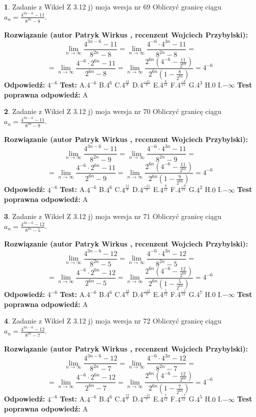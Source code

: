\documentclass[12pt, a4paper]{article}
\theoremstyle{definition} %
\newtheorem{zad}{}
\newcommand{\zadStart}[1]{\begin{zad}#1\newline}
\newcommand{\zadStop}{\end{zad}}
\newcommand{\rozwStart}[2]{\noindent \textbf{Rozwiązanie (autor #1 , recenzent #2): }\newline}
\newcommand{\rozwStop}{\newline}
\newcommand{\odpStart}{\noindent \textbf{Odpowiedź:}\newline}
\newcommand{\odpStop}{\newline}
\newcommand{\testStart}{\noindent \textbf{Test:}\newline}
\newcommand{\testStop}{\newline}
\newcommand{\kluczStart}{\noindent \textbf{Test poprawna odpowiedź:}\newline}
\newcommand{\kluczStop}{\newline}
\begin{document}
\zadStart{Zadanie z Wikieł Z 3.12 j) moja wersja nr 69}
Obliczyć granicę ciągu $a_{n}=\frac{4^{3n-6}-11}{8^{2n}-8}$.
\zadStop
\rozwStart{Patryk Wirkus}{Wojciech Przybylski}
$$\lim\limits_{n\to\infty}\frac{4^{3n-6}-11}{8^{2n}-8}= \lim\limits_{n\to\infty}\frac{4^{-6} \cdot 4^{3n}-11}{8^{2n}-8}=$$
$$= \lim\limits_{n\to\infty}\frac{4^{-6} \cdot 2^{6n}-11}{2^{6n}-8}= \lim\limits_{n\to\infty}\frac{2^{6n}(4^{-6} - \frac{11}{2^{6n}})}{2^{6n}(1-\frac{8}{2^{6n}})}= 4^{-6}$$
\rozwStop
\odpStart
$4^{-6}$
\odpStop
\testStart
A.$4^{-6}$
B.$4^{6}$
C.$4^{\frac{11}{8}}$
D.$4^{\frac{-11}{8}}$
E.$4^{\frac{8}{11}}$
F.$4^{\frac{-8}{11}}$
G.$4^{3}$
H.$0$
I.$-\infty$
\testStop
\kluczStart
A
\kluczStop



\zadStart{Zadanie z Wikieł Z 3.12 j) moja wersja nr 70}
Obliczyć granicę ciągu $a_{n}=\frac{4^{3n-6}-11}{8^{2n}-9}$.
\zadStop
\rozwStart{Patryk Wirkus}{Wojciech Przybylski}
$$\lim\limits_{n\to\infty}\frac{4^{3n-6}-11}{8^{2n}-9}= \lim\limits_{n\to\infty}\frac{4^{-6} \cdot 4^{3n}-11}{8^{2n}-9}=$$
$$= \lim\limits_{n\to\infty}\frac{4^{-6} \cdot 2^{6n}-11}{2^{6n}-9}= \lim\limits_{n\to\infty}\frac{2^{6n}(4^{-6} - \frac{11}{2^{6n}})}{2^{6n}(1-\frac{9}{2^{6n}})}= 4^{-6}$$
\rozwStop
\odpStart
$4^{-6}$
\odpStop
\testStart
A.$4^{-6}$
B.$4^{6}$
C.$4^{\frac{11}{9}}$
D.$4^{\frac{-11}{9}}$
E.$4^{\frac{9}{11}}$
F.$4^{\frac{-9}{11}}$
G.$4^{2}$
H.$0$
I.$-\infty$
\testStop
\kluczStart
A
\kluczStop



\zadStart{Zadanie z Wikieł Z 3.12 j) moja wersja nr 71}
Obliczyć granicę ciągu $a_{n}=\frac{4^{3n-6}-12}{8^{2n}-5}$.
\zadStop
\rozwStart{Patryk Wirkus}{Wojciech Przybylski}
$$\lim\limits_{n\to\infty}\frac{4^{3n-6}-12}{8^{2n}-5}= \lim\limits_{n\to\infty}\frac{4^{-6} \cdot 4^{3n}-12}{8^{2n}-5}=$$
$$= \lim\limits_{n\to\infty}\frac{4^{-6} \cdot 2^{6n}-12}{2^{6n}-5}= \lim\limits_{n\to\infty}\frac{2^{6n}(4^{-6} - \frac{12}{2^{6n}})}{2^{6n}(1-\frac{5}{2^{6n}})}= 4^{-6}$$
\rozwStop
\odpStart
$4^{-6}$
\odpStop
\testStart
A.$4^{-6}$
B.$4^{6}$
C.$4^{\frac{12}{5}}$
D.$4^{\frac{-12}{5}}$
E.$4^{\frac{5}{12}}$
F.$4^{\frac{-5}{12}}$
G.$4^{7}$
H.$0$
I.$-\infty$
\testStop
\kluczStart
A
\kluczStop



\zadStart{Zadanie z Wikieł Z 3.12 j) moja wersja nr 72}
Obliczyć granicę ciągu $a_{n}=\frac{4^{3n-6}-12}{8^{2n}-7}$.
\zadStop
\rozwStart{Patryk Wirkus}{Wojciech Przybylski}
$$\lim\limits_{n\to\infty}\frac{4^{3n-6}-12}{8^{2n}-7}= \lim\limits_{n\to\infty}\frac{4^{-6} \cdot 4^{3n}-12}{8^{2n}-7}=$$
$$= \lim\limits_{n\to\infty}\frac{4^{-6} \cdot 2^{6n}-12}{2^{6n}-7}= \lim\limits_{n\to\infty}\frac{2^{6n}(4^{-6} - \frac{12}{2^{6n}})}{2^{6n}(1-\frac{7}{2^{6n}})}= 4^{-6}$$
\rozwStop
\odpStart
$4^{-6}$
\odpStop
\testStart
A.$4^{-6}$
B.$4^{6}$
C.$4^{\frac{12}{7}}$
D.$4^{\frac{-12}{7}}$
E.$4^{\frac{7}{12}}$
F.$4^{\frac{-7}{12}}$
G.$4^{5}$
H.$0$
I.$-\infty$
\testStop
\kluczStart
A
\kluczStop
\end{document}
